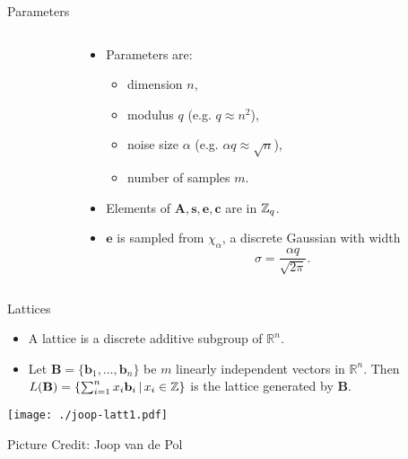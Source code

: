 \documentclass[presentation,smaller]{beamer}
\newcommand{\ZZ}[1][blank]{\ensuremath{\ifthenelse{\equal{#1}{blank}}{\mathbb{Z}}{\mathbb{Z}\left[#1\right]}\xspace}}
\renewcommand{\vec}[1]{\ensuremath{\mathbf{#1}}\xspace}
\begin{document}
\begin{frame}[label={sec:org3159ad1}]{Parameters}
\begin{columns}
\begin{column}{0.5\columnwidth}
\end{column}


\begin{column}{0.5\columnwidth}
\begin{itemize}
\item Parameters are: 
\begin{itemize}
\item dimension \(n\),
\item modulus \(q\) (e.g. \(q \approx n^2\)),
\item noise size \(\alpha\) (e.g. \(\alpha q \approx \sqrt{n}\)),
\item number of samples \(m\).
\end{itemize}

\item Elements of \(\vec{A}, \vec{s}, \vec{e}, \vec{c}\) are in \(\ZZ_q\).
\item \(\vec{e}\) is sampled from \(χ_{α}\), a discrete Gaussian with width \[\sigma=\frac{\alpha q}{\sqrt{2 \pi}}.\]
\end{itemize}
\end{column}
\end{columns}
\end{frame}


\begin{frame}[label={sec:orgd1aa6e2}]{Lattices}
\begin{itemize}
\item A lattice is a discrete additive subgroup of \(\mathbb{R}^n\).

\item Let \(\vec{B} = \{ \vec{b}_1, \ldots, \vec{b}_n \}\) be \(m\) linearly independent vectors in \(\mathbb{R}^n\). Then \(L(\vec{B})=\{ \sum_{i=1}^{n} x_i \vec{b}_i \,|\, x_i \in \ZZ\}\) is the lattice generated by \(\vec{B}\).
\end{itemize}

\begin{center}
\texttt{[image: ./joop-latt1.pdf]}
\end{center}

\tiny Picture Credit: Joop van de Pol
\end{frame}
\end{document}
